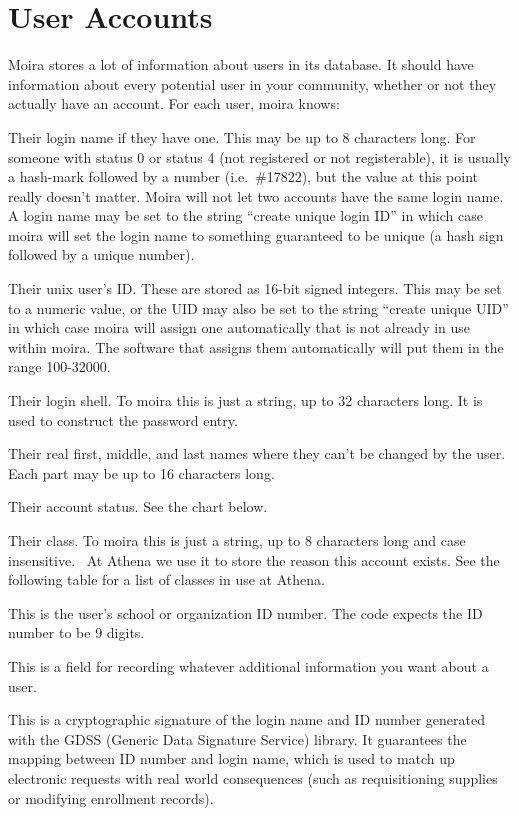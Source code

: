 \documentclass{book}
\begin{document}
\section{User Accounts}
Moira stores a lot of information about users in its database.  It
should have information about every potential user in your community,
whether or not they actually have an account.  For each user, moira
knows:
\begin{description}
\item[login] Their login name if they have one.  This may be up to 8
characters long.  For someone with status 0
or status 4 (not registered or not registerable), it is usually a
hash-mark followed by a number (i.e.\ \#17822), but the value at this
point really doesn't matter.  Moira will not let two accounts have the
same login name.  A login name may be set to the string ``create
unique login ID'' in which case moira will set the login name to
something guaranteed to be unique (a hash sign followed by a unique
number).
\item[UID] Their {\sc unix} user's ID.  These are stored as 16-bit signed
integers.  This may be set to a numeric value, or the UID may also be
set to the string ``create unique UID'' in which case moira will
assign one automatically that is not already in use within moira.  The
software that assigns them automatically will put them in the range
100-32000.
\item[shell] Their login shell.  To moira this is just a string, up to 32
characters long.  It is used to construct the password entry.
\item[name] Their real first, middle, and last names where they can't be
changed by the user.  Each part may be up to 16 characters long.
\item[status] Their account status.  See the chart below.
\item[class] Their class.  To moira this is just a string, up to 8
characters long and case insensitive.  \athena\ At Athena we
use it to store the reason this account exists.  See the following
table for a list of classes in use at Athena.
\item[ID number] This is the user's school or organization ID
number.  The code expects the ID number to be 9 digits.
\item[comment] This is a field for recording whatever additional
information you want about a user.
\item[signature] This is a cryptographic signature of the login name
and ID number generated with the GDSS (Generic Data Signature Service)
library.  It guarantees the mapping between ID number and login name,
which is used to match up electronic requests with real world
consequences (such as requisitioning supplies or modifying enrollment
records).
\end{description}
\end{document}
